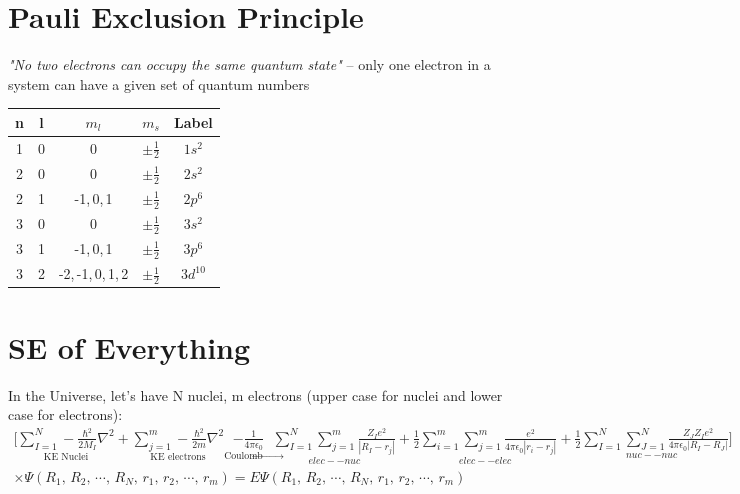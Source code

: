 \documentclass[a4paper, 11pt, fleqn, normalem]{report}
\begin{document}
\section{Pauli Exclusion Principle}
\emph{"No two electrons can occupy the same quantum state"} -- only one electron in a system can have a given set of quantum numbers
\begin{table}[H]
    \begin{tabular}{c|ccc|c}
        n & l & $m_{l}$ & $m_{s}$ & Label \\
        \hline
        1 & 0 & 0 & $\pm \frac{1}{2}$ & $1s^{2}$ \\
        2 & 0 & 0 & $\pm \frac{1}{2}$ & $2s^{2}$ \\
        2 & 1 & -1,\,0,\,1 & $\pm \frac{1}{2}$ & $2p^{6}$ \\
        3 & 0 & 0 & $\pm \frac{1}{2}$ & $3s^{2}$ \\
        3 & 1 & -1,\,0,\,1 & $\pm \frac{1}{2}$ & $3p^{6}$ \\
        3 & 2 & -2,\,-1,\,0,\,1,\,2 & $\pm \frac{1}{2}$ & $3d^{10}$
    \end{tabular}
\end{table}

\section{SE of Everything}
In the Universe, let's have N nuclei, m electrons (upper case for nuclei and lower case for electrons):
\begin{multline*}
    \Bigg[\underset{\text{KE Nuclei}}{\sum_{I = 1}^{N}-\frac{\hbar^{2}}{2M_{I}}\nabla^{2}} + \underset{\text{KE electrons}}{\sum_{j = 1}^{m}-\frac{\hbar^{2}}{2m} \nabla^{2}} \underset{\text{Coulomb} \rightarrow}{- \frac{1}{4\pi\epsilon_{0}}} \underset{elec--nuc}{\sum_{I = 1}^{N}\sum_{j = 1}^{m}\frac{Z_{I}e^{2}}{|R_{I} - r_{j}|}} + \underset{elec--elec}{\frac{1}{2}\sum_{i = 1}^{m}\sum_{j = 1}^{m}\frac{e^{2}}{4\pi\epsilon_{0}|r_{i} - r_{j}|}} + \underset{nuc--nuc}{\frac{1}{2}\sum_{I = 1}^{N}\sum_{J = 1}^{N}\frac{Z_{J}Z_{I}e^{2}}{4\pi\epsilon_{0}|R_{I} - R_{J}|}}\Bigg] \\
    \times \Psi(R_{1},\,R_{2},\, \cdots ,\,R_{N},\,r_{1},\,r_{2},\, \cdots ,\,r_{m}) = E\Psi(R_{1},\,R_{2},\, \cdots ,\,R_{N},\,r_{1},\,r_{2},\, \cdots ,\,r_{m})
\end{multline*}

\newpage
\end{document}
